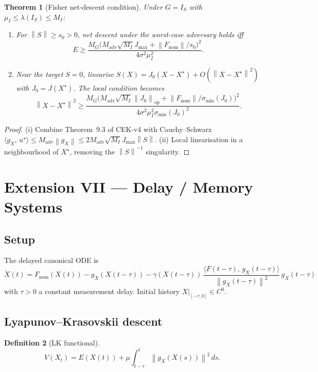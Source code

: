 \documentclass[11pt,a4paper]{article}
\newtheorem{theorem}{Theorem}[section]
\theoremstyle{definition}
\newtheorem{definition}[theorem]{Definition}
\newcommand{\norm}[1]{\left\|#1\right\|}
\newcommand{\inner}[2]{\langle #1,\,#2\rangle}
\newcommand{\nom}{\mathrm{nom}}
\newcommand{\adv}{\mathrm{adv}}
\begin{document}
\begin{theorem}[Fisher net-descent condition]
\label{thm:ar4}
Under $G = I_S$ with $\mu_I \leq \lambda(I_S) \leq M_I$:
\begin{enumerate}[label=(\roman*)]
\item For $\norm{S} \geq s_0 > 0$, net descent under the worst-case adversary holds iff
\[
E \geq \frac{M_G \big(M_\adv \sqrt{M_I} J_{\max} + \norm{F_\nom}/s_0\big)^2}{4\sigma^2 \mu_I^2}.
\]
\item Near the target $S = 0$, linearise $S(X) = J_0(X - X^\star) + O(\norm{X - X^\star}^2)$ with $J_0 = J(X^\star)$. The local condition becomes
\[
\norm{X - X^\star}^2 \geq \frac{M_G \big(M_\adv \sqrt{M_I} \norm{J_0}_\mathrm{op} + \norm{F_\nom}/\sigma_{\min}(J_0)\big)^2}{4\sigma^2 \mu_I^2 \sigma_{\min}(J_0)^2}.
\]
\end{enumerate}
\end{theorem}

\begin{proof}
(i) Combine Theorem~9.3 of CEK-v4 with Cauchy--Schwarz $\inner{g_X}{u^\star} \leq M_\adv \norm{g_X} \leq 2 M_\adv \sqrt{M_I} J_{\max} \norm{S}$. (ii) Local linearisation in a neighbourhood of $X^\star$, removing the $\norm{S}^{-1}$ singularity.
\end{proof}

\newpage

\section{Extension VII --- Delay / Memory Systems}

\subsection{Setup}

The delayed canonical ODE is
\[
\dot X(t) = F_\nom(X(t)) - g_X(X(t-\tau)) - \gamma(X(t-\tau))\,\frac{\inner{F(t-\tau)}{g_X(t-\tau)}}{\norm{g_X(t-\tau)}^2}\,g_X(t-\tau)
\]
with $\tau > 0$ a constant measurement delay. Initial history $X|_{[-\tau,0]} \in C^0$.

\subsection{Lyapunov--Krasovskii descent}

\begin{definition}[LK functional]
\[
V(X_t) = E(X(t)) + \mu \int_{t-\tau}^t \norm{g_X(X(s))}^2\,ds.
\]
\end{definition}
\end{document}
